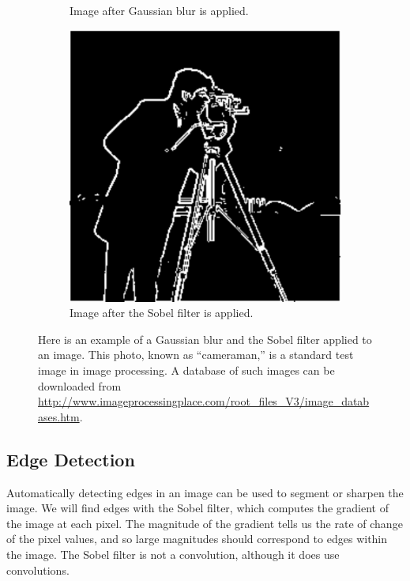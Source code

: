 \begin{figure}
\begin{subfigure}[b]{.49\textwidth}
\caption{Image after Gaussian blur is applied.}
\label{fig:cameraman_blur}
\end{subfigure}
\begin{subfigure}[b]{.49\textwidth}
\centering
\includegraphics[width=\textwidth]{edges.pdf}
\caption{Image after the Sobel filter is applied.}
\label{fig:cameraman_edges}
\end{subfigure}
\caption{Here is an example of a Gaussian blur and the Sobel filter applied to an image. 
This photo, known as ``cameraman,'' is a standard test image in image processing. 
A database of such images can be downloaded from \url{http://www.imageprocessingplace.com/root_files_V3/image_databases.htm}.}
\label{fig:cameraman1}
\end{figure}



\subsection*{Edge Detection}

Automatically detecting edges in an image can be used to segment or sharpen the image. 
We will find edges with the Sobel filter, which computes the gradient of the image at each pixel. 
The magnitude of the gradient tells us the rate of change of the pixel values, and so large magnitudes should
correspond to edges within the image. 
The Sobel filter is not a convolution, although it does use convolutions.


